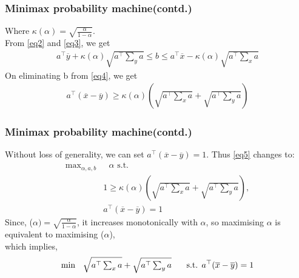 \documentclass{beamer}
\begin{document}
\begin{frame}[fragile]
\frametitle{Minimax probability machine(contd.)}
Where $\kappa(\alpha)=\sqrt{\frac{\alpha}{1-\alpha}}$.\\
From \eqref{eq2} and \eqref{eq3}, we get 
\begin{align}
    a^{\top} \overline{y}+\kappa(\alpha)\sqrt{a^{\top}\textstyle \sum_y a} \leq b \leq a^{\top}\overline{x}-\kappa(\alpha)\sqrt{a^{\top}\textstyle \sum_x a} \label{eq4}
\end{align}
On eliminating b from \eqref{eq4}, we get
\begin{align}
    a^{\top}(\overline{x}-\overline{y})\geq \kappa(\alpha)\left( \sqrt{a^{\top}\textstyle \sum_x a}+\sqrt{a^{\top}\textstyle \sum_y a}\right) \label{eq5}
\end{align}
\end{frame}
\begin{frame}[fragile]
\frametitle{Minimax probability machine(contd.)}
Without loss of generality, we can set $a^{\top}(\overline{x}-\overline{y})=1$. Thus \eqref{eq5} changes to:
\begin{align}
    \text{max}_{\alpha,a,b} &\text{ $\alpha$} \text{ s.t.} \nonumber\\
    &1\geq \kappa(\alpha)\left( \sqrt{a^{\top}\textstyle \sum_x a}+\sqrt{a^{\top}\textstyle \sum_y a}\right),\\
    &a^{\top}(\overline{x}-\overline{y})=1\nonumber
    \end{align}
    Since, \kappa($\alpha)=\sqrt{\frac{\alpha}{1-\alpha}}$, it increases monotonically with $\alpha$, so maximising $\alpha$ is equivalent to maximising \kappa($\alpha$), \\
    which implies,
    \begin{align}
        \text{min  }\hspace{.2cm} \sqrt{a^{\top}\textstyle \sum_{x} a}+\sqrt{a^{\top}\textstyle \sum_{y} a} \hspace{.5cm} \text{ s.t. } a^{\top}(\overline{x}-\overline{y})=1 \label{eq7}
    \end{align}
\end{frame}
\end{document}

